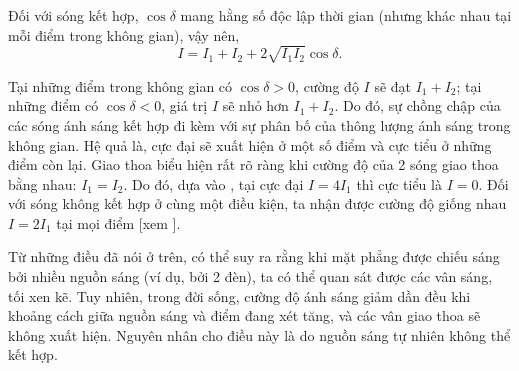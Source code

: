 Đối với sóng kết hợp, $\cos\delta$ mang hằng số độc lập thời gian (nhưng khác nhau tại mỗi điểm trong không gian), vậy nên,
\begin{equation}\label{eq:17_2}
    I = I_1 + I_2 + 2 \sqrt{I_1 I_2} \cos \delta.
\end{equation}

\noindent
Tại những điểm trong không gian có $\cos\delta>0$, cường độ $I$ sẽ đạt $I_1+I_2$; tại những điểm có $\cos\delta<0$, giá trị $I$ sẽ nhỏ hơn $I_1+I_2$. 
Do đó, sự chồng chập của các sóng ánh sáng kết hợp đi kèm với sự phân bố của thông lượng ánh sáng trong không gian.
Hệ quả là, cực đại sẽ xuất hiện ở một số điểm và cực tiểu ở những điểm còn lại.
Giao thoa biểu hiện rất rõ ràng khi cường độ của 2 sóng giao thoa bằng nhau: $I_1=I_2$.
Do đó, dựa vào , tại cực đại $I=4I_1$ thì cực tiểu là $I=0$.
Đối với sóng không kết hợp ở cùng một điều kiện, ta nhận được cường độ giống nhau $I=2I_1$ tại mọi điểm [xem ].

Từ những điều đã nói ở trên, có thể suy ra rằng khi mặt phẳng được chiếu sáng bởi nhiều nguồn sáng (ví dụ, bởi 2 đèn), ta có thể quan sát được các vân sáng, tối xen kẽ.
Tuy nhiên, trong đời sống, cường độ ánh sáng giảm dần đều khi khoảng cách giữa nguồn sáng và điểm đang xét tăng, và các vân giao thoa sẽ không xuất hiện.
Nguyên nhân cho điều này là do nguồn sáng tự nhiên không thể kết hợp.

